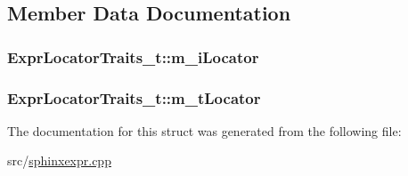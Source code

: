 \subsection{Member Data Documentation}
\hypertarget{structExprLocatorTraits__t_a596e9ebdf6a45a69b9da0f58d6d243f6}{
\subsubsection[{m\-\_\-i\-Locator}]{ Expr\-Locator\-Traits\-\_\-t\-::m\-\_\-i\-Locator}}\label{structExprLocatorTraits__t_a596e9ebdf6a45a69b9da0f58d6d243f6}
\hypertarget{structExprLocatorTraits__t_a4c62c299c26478e8ba9153ff2912da74}{
\subsubsection[{m\-\_\-t\-Locator}]{ Expr\-Locator\-Traits\-\_\-t\-::m\-\_\-t\-Locator}}\label{structExprLocatorTraits__t_a4c62c299c26478e8ba9153ff2912da74}


The documentation for this struct was generated from the following file\-:\begin{DoxyCompactItemize}
\item 
src/\hyperlink{sphinxexpr_8cpp}{sphinxexpr.\-cpp}\end{DoxyCompactItemize}
